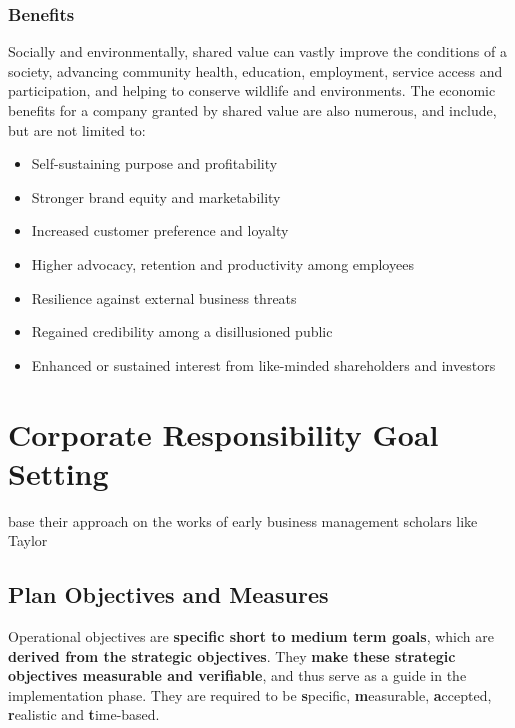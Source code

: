 \documentclass[11pt]{article}
\theoremstyle{definition}
\begin{document}
\subsubsection{Benefits}
Socially and environmentally, shared value can vastly improve the conditions of a society, advancing community health, education, employment, service access and participation, and helping to conserve wildlife and environments. The economic benefits for a company granted by shared value are also numerous, and include, but are not limited to:
\begin{itemize}[label=-, nosep]
	\item Self-sustaining purpose and profitability
	\item Stronger brand equity and marketability
	\item Increased customer preference and loyalty
	\item Higher advocacy, retention and productivity among employees
	\item Resilience against external business threats
	\item Regained credibility among a disillusioned public
	\item Enhanced or sustained interest from like-minded shareholders and investors
\end{itemize}
\section{Corporate Responsibility Goal Setting}
\citeauthor{stead2008sustainable} base their approach on the works of early business management scholars like Taylor 

\subsection{Plan Objectives and Measures}
Operational objectives are \textbf{specific short to medium term goals}, which are \textbf{derived from the strategic objectives}. They \textbf{make these strategic objectives measurable and verifiable}, and thus serve as a guide in the implementation phase. They are required to be \textbf{s}pecific, \textbf{m}easurable, \textbf{a}ccepted, \textbf{r}ealistic and \textbf{t}ime-based.
\end{document}
